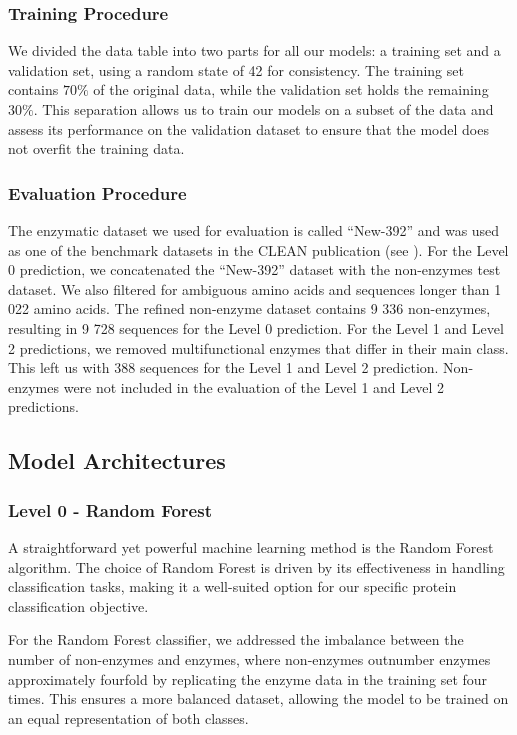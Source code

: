 \documentclass{bioinfo}
\begin{document}
\begin{methods}
\subsubsection{Training Procedure}
We divided the data table into two parts for all our models: a training set and a validation set, using a random state of 42 for consistency. 
The training set contains $70\%$ of the original data, while the validation set holds the remaining $30\%$. 
This separation allows us to train our models on a subset of the data and assess its performance on 
the validation dataset to ensure that the model does not overfit the training data.

\subsubsection{Evaluation Procedure}
The enzymatic dataset we used for evaluation is called ``New-392'' and was used as one of the benchmark datasets 
in the CLEAN publication (see \cite{CleanArticle}).
For the Level 0 prediction, we concatenated the ``New-392'' dataset with the non-enzymes test dataset.
We also filtered for ambiguous amino acids and sequences longer than 1 022 amino acids.
The refined non-enzyme dataset contains 9 336 non-enzymes, resulting in 9 728 sequences for the Level 0 prediction.
For the Level 1 and Level 2 predictions, we removed multifunctional enzymes that differ in their main class.
This left us with 388 sequences for the Level 1 and Level 2 prediction.
Non-enzymes were not included in the evaluation of the Level 1 and Level 2 predictions.

\subsection{Model Architectures}
\subsubsection{Level 0 - Random Forest}
A straightforward yet powerful machine learning method is the Random
Forest algorithm. The choice of Random Forest is driven by its
effectiveness in handling classification tasks, making it a well-suited
option for our specific protein classification objective. 

For the Random Forest classifier, we addressed the imbalance between the number of non-enzymes and enzymes, 
where non-enzymes outnumber enzymes approximately
fourfold by replicating the enzyme data in the training set four times.
This ensures a more balanced dataset, allowing the model to
be trained on an equal representation of both classes.


\end{methods}
\end{document}
